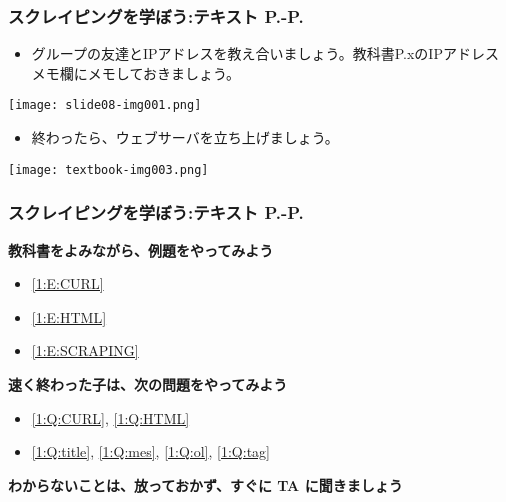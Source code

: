 \begin{frame}[fragile]
	\frametitle{スクレイピングを学ぼう:テキスト P.\pageref{1:P:intro}-P.\pageref{1:P:charCode}~~~}
        \begin{itemize}
            \item グループの友達とIPアドレスを教え合いましょう。教科書P.xのIPアドレスメモ欄にメモしておきましょう。
        \end{itemize}
        \begin{minipage}{\textwidth}
            {\upshape
              \texttt{[image: slide08-img001.png]}}
        \end{minipage}
        \begin{itemize}
            \item 終わったら、ウェブサーバを立ち上げましょう。
        \end{itemize}
        \begin{minipage}{\textwidth}
            {\upshape
              \texttt{[image: textbook-img003.png]}}
        \end{minipage}
\end{frame}

\begin{frame}[fragile]
	\frametitle{スクレイピングを学ぼう:テキスト P.\pageref{1:P:intro}-P.\pageref{1:P:charCode}~~~}
      \large\textbf{教科書をよみながら、例題をやってみよう}
				\begin{itemize}
					\item \ref*{1:E:CURL}
					\item \ref*{1:E:HTML}
					\item \ref*{1:E:SCRAPING}
				\end{itemize}
      \vfill
      \large\textbf{速く終わった子は、次の問題をやってみよう}
				\begin{itemize}
					\item \ref*{1:Q:CURL}, \ref*{1:Q:HTML}
					\item \ref*{1:Q:title}, \ref*{1:Q:mes}, \ref*{1:Q:ol}, \ref*{1:Q:tag}
				\end{itemize}
      \vfill
      \large\textbf{わからないことは、放っておかず、すぐに TA に聞きましょう}
\end{frame}

